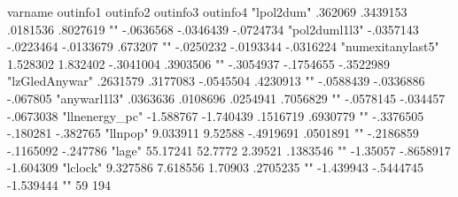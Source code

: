 varname	outinfo1	outinfo2	outinfo3	outinfo4
"lpol2dum"	.362069	.3439153	.0181536	.8027619
""	-.0636568	-.0346439	-.0724734	
"pol2duml1l3"	-.0357143	-.0223464	-.0133679	.673207
""	-.0250232	-.0193344	-.0316224	
"numexitanylast5"	1.528302	1.832402	-.3041004	.3903506
""	-.3054937	-.1754655	-.3522989	
"lzGledAnywar"	.2631579	.3177083	-.0545504	.4230913
""	-.0588439	-.0336886	-.067805	
"anywarl1l3"	.0363636	.0108696	.0254941	.7056829
""	-.0578145	-.034457	-.0673038	
"llnenergy_pc"	-1.588767	-1.740439	.1516719	.6930779
""	-.3376505	-.180281	-.382765	
"llnpop"	9.033911	9.52588	-.4919691	.0501891
""	-.2186859	-.1165092	-.247786	
"lage"	55.17241	52.7772	2.39521	.1383546
""	-1.35057	-.8658917	-1.604309	
"lclock"	9.327586	7.618556	1.70903	.2705235
""	-1.439943	-.5444745	-1.539444	
""	59	194		
